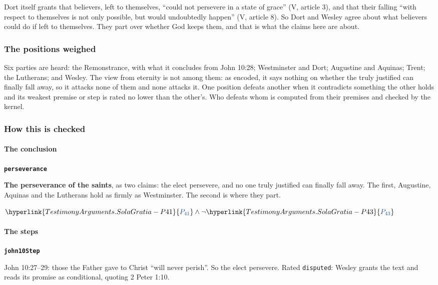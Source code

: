 \documentclass[11pt]{article}
\makeatletter
\newcommand{\pvar}[2]{\hyperlink{#1-P#2}{\textcolor{claimlink}{P_{#2}}}}
\newenvironment{derivation}
  {\begin{list}{}{\setlength{\leftmargin}{2.6em}\setlength{\labelwidth}{2.2em}%
    \setlength{\labelsep}{0.4em}\setlength{\itemsep}{2pt}\setlength{\parsep}{0pt}%
    \setlength{\topsep}{6pt}\@beginparpenalty\@M\@itempenalty\@M%
    \interlinepenalty\@M\raggedright}}
  {\end{list}}
\makeatother
\begin{document}
Dort itself grants that believers, left to themselves, “could not persevere in a state of grace” (V, article 3), and that their falling “with respect to themselves is not only possible, but would undoubtedly happen” (V, article 8). So Dort and Wesley agree about what believers could do if left to themselves. They part over whether God keeps them, and that is what the claims here are about.

\subsubsection*{The positions weighed}
Six parties are heard: the Remonstrance, with what it concludes from John 10:28; Westminster and Dort; Augustine and Aquinas; Trent; the Lutherans; and Wesley. The view from eternity is not among them: as encoded, it says nothing on whether the truly justified can finally fall away, so it attacks none of them and none attacks it. One position defeats another when it contradicts something the other holds and its weakest premise or step is rated no lower than the other’s. Who defeats whom is computed from their premises and checked by the kernel.

\subsubsection*{How this is checked}
\paragraph*{The conclusion}
\leavevmode\par\nobreak
\par\medskip\noindent\textbf{\texttt{perseverance}}\par\nobreak\noindent
\textbf{The perseverance of the saints}, as two claims: the elect persevere, and no one truly justified can finally fall away. The first, Augustine, Aquinas and the Lutherans hold as firmly as Westminster. The second is where they part.

\begin{derivation}
  \item[] \(\pvar{TestimonyArguments.SolaGratia}{41} \land \lnot \pvar{TestimonyArguments.SolaGratia}{43}\)
\end{derivation}
\paragraph*{The steps}
\leavevmode\par\nobreak
\par\medskip\noindent\textbf{\texttt{john10\allowbreak{}Step}}\par\nobreak\noindent
John 10:27–29: those the Father gave to Christ “will never perish”. So the elect persevere. Rated \texttt{disputed}: Wesley grants the text and reads its promise as conditional, quoting 2 Peter 1:10.
\end{document}
